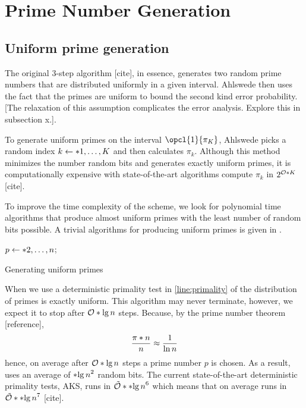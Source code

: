 \section{Prime Number Generation}
\subsection{Uniform prime generation}
The original 3-step algorithm [cite], in essence, generates two random prime numbers that are distributed uniformly in a given interval. Ahlswede then uses the fact that the primes are uniform to bound the second kind error probability. [The relaxation of this assumption complicates the error analysis. Explore this in subsection x.]. 

To generate uniform primes on the interval \(\opcl{1}{\pi_K}\), Ahlswede picks a random index \(k \gets \set{1, \dots, K}\) and then calculates \(\pi_k\). Although this method minimizes the number random bits and generates exactly uniform primes, it is computationally expensive with state-of-the-art algorithms compute \(\pi_k\) in \(2^{\bigO{K}}\)[cite]. 

To improve the time complexity of the scheme, we look for polynomial time algorithms that produce almost uniform primes with the least number of random bits possible. A trivial algorithms for producing uniform primes is given in .
\begin{algorithm}
	\DontPrintSemicolon
    {
        \(p \gets \set{2,\dots, n}\);
    }
	\caption{Generating uniform primes}
    \label{alg:trivialPNG}
\end{algorithm}

When we use a deterministic primality test in \cref{line:primality} of  the distribution of primes is exactly uniform. This algorithm may never terminate, however, we expect it to stop after \(\bigO{\lg n}\) steps. Because, by the prime number theorem [reference], 
\begin{equation}
    \dfrac{\func{\pi}{n}}{n} \approx \dfrac{1}{\ln n}
\end{equation}
hence, on average after \(\bigO{\lg n}\) steps a prime number \(p\) is chosen. As a result,  uses an average of \(\bracket{\lg n}^2\) random bits. The current state-of-the-art deterministic primality tests, AKS, runs in \(\logBigO{\bracket{\lg n}^6}\) which means that on average  runs in \(\logBigO{\bracket{\lg n}^7}\) [cite]. 

